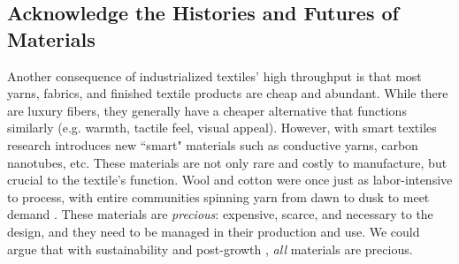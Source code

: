


\subsection{Acknowledge the Histories and Futures of Materials}

Another consequence of industrialized textiles' high throughput is that most yarns, fabrics, and finished textile products are cheap and abundant. While there are luxury fibers, they generally have a cheaper alternative that functions similarly (e.g. warmth, tactile feel, visual appeal). However, with smart textiles research introduces new ``smart" materials such as conductive yarns, carbon nanotubes, etc. These materials are not only rare and costly to manufacture, but crucial to the textile's function. Wool and cotton were once just as labor-intensive to process, with entire communities spinning yarn from dawn to dusk to meet demand \cite{black_knitting:_2012}. These materials are \emph{precious}: expensive, scarce, and necessary to the design, and they need to be managed in their production and use. We could argue that with sustainability and post-growth \cite{fletcher_craft_2016}, \emph{all} materials are precious.

